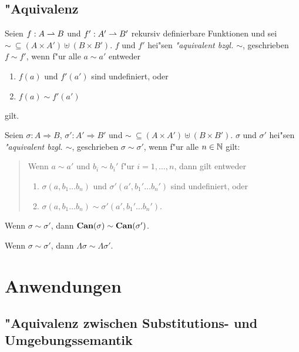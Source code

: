 \documentclass[12pt,a4paper]{article}
\begin{document}
\subsection{"Aquivalenz}

\begin{definition}
  Seien $f:A \rightharpoonup B$ und $f':A' \rightharpoonup B'$ rekursiv definierbare Funktionen und
  sei $\sim\ \subseteq (A \times A') \uplus (B \times B')$. $f$ und $f'$ hei"sen
  \emph{"aquivalent bzgl. $\sim$}, geschrieben $f \sim f'$, wenn f"ur
  alle $a \sim a'$ entweder
  \begin{enumerate}
  \item $f(a)$ und $f'(a')$ sind undefiniert, oder
  \item $f(a) \sim f'(a')$
  \end{enumerate}
  gilt.
\end{definition}

\begin{definition}
  Seien $\sigma:A \Rightarrow B$, $\sigma': A' \Rightarrow B'$ und $\sim\ \subseteq (A \times A') \uplus (B \times B')$.
  $\sigma$ und $\sigma'$ hei"sen \emph{"aquivalent bzgl. $\sim$}, geschrieben $\sigma \sim \sigma'$,
  wenn f"ur alle $n \in \mathbb N$ gilt:
  \begin{quote}
    Wenn $a \sim a'$ und $b_i \sim b_i'$ f"ur $i=1,\ldots,n$, dann gilt entweder
    \begin{enumerate}
    \item $\sigma(a,b_1 \ldots b_n)$ und $\sigma'(a',b_1' \ldots b_n')$ sind undefiniert, oder
    \item $\sigma(a,b_1 \ldots b_n) \sim \sigma'(a',b_1' \ldots b_n')$.
    \end{enumerate}
  \end{quote}
\end{definition}

\begin{corollary}
  Wenn $\sigma \sim \sigma'$, dann $\mathbf{Can}(\sigma) \sim \mathbf{Can}(\sigma')$.
\end{corollary}

\begin{corollary} \label{corollary:Equiv}
  Wenn $\sigma \sim \sigma'$, dann $\Lambda \sigma \sim \Lambda \sigma'$.
\end{corollary}


\section{Anwendungen}

\subsection{"Aquivalenz zwischen Substitutions- und Umgebungssemantik}
\end{document}
